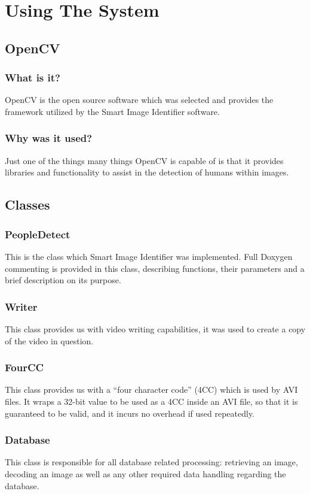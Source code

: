 \documentclass[a4paper,12pt]{report}
\begin{document}
	
	\section{Using The System}
	\subsection{OpenCV}
	\subsubsection{What is it?}
	OpenCV is the open source software which was selected and provides the framework
	utilized by the Smart Image Identifier software.
	\subsubsection{Why was it used?}
	Just one of the things many things OpenCV is capable of is that it provides libraries and
	functionality to assist in the detection of humans within images.

	\subsection{Classes}
	\subsubsection{PeopleDetect}
	This is the class which Smart Image Identifier was implemented.
	Full Doxygen commenting is provided in this class, describing functions, their parameters
	and a brief description on its purpose.
	\subsubsection{Writer}
This class provides us with video writing capabilities, it was used to create a copy of the
video in question.
\subsubsection{FourCC}
This class provides us with a “four character code” (4CC) which is used by AVI files.
It wraps a 32-bit value to be used as a 4CC inside an AVI file, so that it is guaranteed to be
valid, and it incurs no overhead if used repeatedly.

\subsubsection{Database}
This class is responsible for all database related processing: retrieving an image, decoding an image as well as any other required data handling regarding the database.
\end{document}
